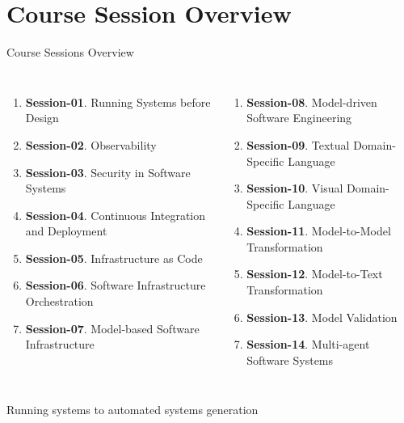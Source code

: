 \documentclass[aspectratio=169, table]{beamer}
\begin{document}
\section{Course Session Overview}
\begin{frame}{Course Sessions Overview}
	\vspace{6pt}
	\footnotesize
	\begin{columns}[t]
		\begin{enumerate}
			\setlength{\itemsep}{1pt}
			\item \textbf{Session-01}. Running Systems before Design
			\item \textbf{Session-02}. Observability
			\item \textbf{Session-03}. Security in Software Systems
			\item \textbf{Session-04}. Continuous Integration and Deployment
			\item \textbf{Session-05}. Infrastructure as Code
			\item \textbf{Session-06}. Software Infrastructure Orchestration
			\item \textbf{Session-07}. Model-based Software Infrastructure
		\end{enumerate}
		
		\begin{enumerate}
			\setlength{\itemsep}{1pt}
			\setcounter{enumi}{7}
			\item \textbf{Session-08}. Model-driven Software Engineering
			\item \textbf{Session-09}. Textual Domain-Specific Language
			\item \textbf{Session-10}. Visual Domain-Specific Language
			\item \textbf{Session-11}. Model-to-Model Transformation
			\item \textbf{Session-12}. Model-to-Text Transformation
			\item \textbf{Session-13}. Model Validation
			\item \textbf{Session-14}. Multi-agent Software Systems
		\end{enumerate}
	\end{columns}
	
	\vspace{6pt}
	{\scriptsize Running systems to automated systems generation}
\end{frame}
\end{document}
